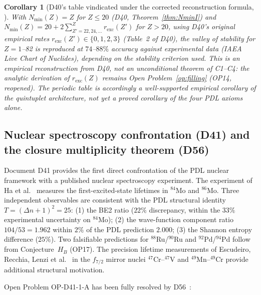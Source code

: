 \documentclass[11pt,a4paper]{article}
\theoremstyle{plain}
\newtheorem{corollary}[theorem]{Corollary}
\theoremstyle{definition}
\theoremstyle{remark}
\newcommand{\rexc}{r_{\mathrm{exc}}}
\newcommand{\Nmin}{N_{\min}}
\begin{document}
\begin{corollary}[D40's table vindicated under the corrected reconstruction formula, \cite{D47v2}]
\label{cor:valley}
With $\Nmin(Z) = Z$ for $Z \leq 20$ (D40, Theorem~\ref{thm:NminI}) and $\Nmin(Z) = 20 + 2\sum_{Z'=22,24,\ldots}^{Z} \rexc(Z')$ for $Z > 20$, using D40's original empirical rates $\rexc(Z') \in \{0,1,2,3\}$ (Table~2 of D40), the valley of stability for $Z=1$--82 is reproduced at $74$--$88\%$ accuracy against experimental data (IAEA Live Chart of Nuclides), depending on the stability criterion used. This is an empirical reconstruction from D40, \emph{not} an unconditional theorem of C1--C4: the analytic derivation of $\rexc(Z)$ remains Open Problem~\ref{op:filling} (OP14, reopened). The periodic table is accordingly a well-supported empirical corollary of the quintuplet architecture, not yet a proved corollary of the four PDL axioms alone.
\end{corollary}

\subsection{Nuclear spectroscopy confrontation (D41) and the closure multiplicity theorem (D56)}
\label{subsec:d41}
Document D41 provides the first direct confrontation of the PDL nuclear framework with a published nuclear spectroscopy experiment. The experiment of Ha et al.~\cite{Ha2025} measures the first-excited-state lifetimes in $^{84}$Mo and $^{86}$Mo. Three independent observables are consistent with the PDL structural identity $T=(\Delta n+1)^2=25$: (1) the BE2 ratio ($22\%$ discrepancy, within the $33\%$ experimental uncertainty on $^{84}$Mo); (2) the wave-function component ratio $104/53 = 1.962$ within $2\%$ of the PDL prediction $2.000$; (3) the Shannon entropy difference ($25\%$). Two falsifiable predictions for $^{88}$Ru/$^{90}$Ru and $^{92}$Pd/$^{94}$Pd follow from Conjecture~$H_B$ (OP17). The precision lifetime measurements of Escudeiro, Recchia, Lenzi et al.~\cite{Escudeiro2026} in the $f_{7/2}$ mirror nuclei $^{47}$Cr--$^{47}$V and $^{49}$Mn--$^{49}$Cr provide additional structural motivation.

Open Problem OP-D41-1-A has been fully resolved by D56~\cite{D56}:
\end{document}
